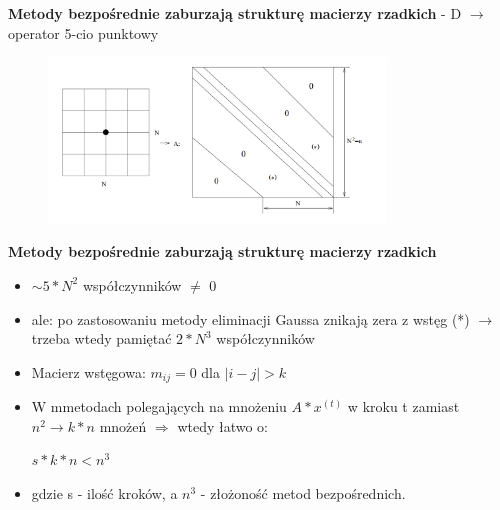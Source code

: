 \begin{frame}{}
  \textbf{Metody bezpośrednie zaburzają strukturę macierzy rzadkich}
   - D $\rightarrow$ operator 5-cio punktowy
  \begin{figure}
    \centering
    \includegraphics[height=0.5\textheight, width=0.8\textwidth]{img/12/iteracja1}
  \end{figure}
\end{frame}

\begin{frame}{}
  \begin{block}{\textbf{Metody bezpośrednie zaburzają strukturę macierzy rzadkich}}
    \begin{itemize}
      \item{$\sim 5*N^2$ współczynników $\neq$ 0}
      \item{ale: po zastosowaniu metody eliminacji Gaussa znikają zera z wstęg
      \newline (*) $\rightarrow$ trzeba wtedy pamiętać $2*N^3$ współczynników}
      \item{Macierz wstęgowa: $m_{ij}=0$ dla $|i-j|>k$}
      \item W mmetodach polegających na mnożeniu $A*x^{(t)}$ w kroku t zamiast $n^2 \rightarrow k*n$ mnożeń $\Rightarrow$ wtedy łatwo o:
      \begin{center}
      $s*k*n<n^3$
      \end{center}
      \item gdzie s - ilość kroków, a $n^3$ - złożoność metod bezpośrednich.
    \end{itemize}
  \end{block}
\end{frame}
